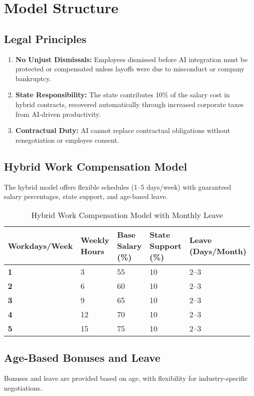 \documentclass[12pt]{article}
\begin{document}
\section{Model Structure}

\subsection{Legal Principles}
\begin{enumerate}
  \item \textbf{No Unjust Dismissals:} Employees dismissed before AI integration must be protected or compensated unless layoffs were due to misconduct or company bankruptcy.
  \item \textbf{State Responsibility:} The state contributes 10\% of the salary cost in hybrid contracts, recovered automatically through increased corporate taxes from AI-driven productivity.
  \item \textbf{Contractual Duty:} AI cannot replace contractual obligations without renegotiation or employee consent.
\end{enumerate}

\subsection{Hybrid Work Compensation Model}
The hybrid model offers flexible schedules (1--5 days/week) with guaranteed salary percentages, state support, and age-based leave.

\begin{table}[!htbp] %
\centering
\begin{tabular}{|>{\bfseries}p{2.5cm}|p{2.5cm}|p{2.5cm}|p{2.5cm}|p{2.5cm}|} %
\hline
Workdays/Week & Weekly Hours & Base Salary (\%) & State Support (\%) & Leave (Days/Month) \\
\hline
1 & 3 & 55 & 10 & 2--3 \\
2 & 6 & 60 & 10 & 2--3 \\
3 & 9 & 65 & 10 & 2--3 \\
4 & 12 & 70 & 10 & 2--3 \\
5 & 15 & 75 & 10 & 2--3 \\
\hline
\end{tabular}
\caption{Hybrid Work Compensation Model with Monthly Leave}
\end{table}

\subsection{Age-Based Bonuses and Leave}
Bonuses and leave are provided based on age, with flexibility for industry-specific negotiations.
\end{document}
